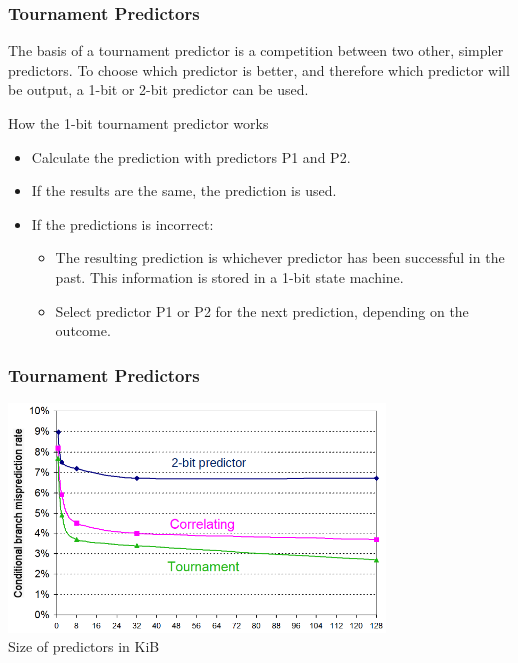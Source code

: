 \documentclass{beamer}
\begin{document}
\begin{frame}
\frametitle{Tournament Predictors}

The basis of a tournament predictor is a competition between two other, simpler predictors. To choose which predictor is better, and therefore which predictor will be output, a 1-bit or 2-bit predictor can be used.

\bigskip
How the 1-bit tournament predictor works
\begin{itemize}
\item Calculate the prediction with predictors P1 and P2.
\item If the results are the same, the prediction is used.
\item If the predictions is incorrect:
\begin{itemize}
\item The resulting prediction is whichever predictor has been successful in the past. This information is stored in a 1-bit state machine.
\item Select predictor P1 or P2 for the next prediction, depending on the outcome.
\end{itemize}
\end{itemize}
\end{frame}

\begin{frame}
\frametitle{Tournament Predictors}

\begin{center}
\includegraphics[width=0.75\textwidth]{fig/tournament.png}\\
\small Size of predictors in KiB
\end{center}
\end{frame}
\end{document}
